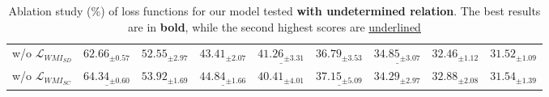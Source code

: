 \begin{table*}[ht]
\begin{adjustbox}{width=\textwidth}
\begin{tabular}{lllllllll}
\quad w/o $\mathcal{L}_{WMI_{SD}}$ & $62.66_{\pm 0.57}$ & $52.55_{\pm 2.97}$ & $43.41_{\pm 2.07}$ & $\underline{41.26_{\pm 3.31}}$ & $36.79_{\pm 3.53}$ & $\underline{34.85_{\pm 3.07}}$ & $32.46_{\pm 1.12}$ & $31.52_{\pm 1.09}$ \\

\quad w/o $\mathcal{L}_{WMI_{SC}}$ &$\underline{64.34_{\pm 0.60}}$ & $\mathbf{53.92_{\pm 1.69}}$ & $\underline{44.84_{\pm 1.66}}$ & $40.41_{\pm 4.01}$ & $\underline{37.15_{\pm 5.09}}$ & $34.29_{\pm 2.97}$ & \underline{$32.88_{\pm 2.08}$} & \underline{$31.54_{\pm 1.39}$} \\


\bottomrule

\end{tabular}%
\end{adjustbox}
\caption{Ablation study (\%) of loss functions for our model tested \textbf{with undetermined relation}. The best results are in \textbf{bold}, while the second highest scores are \underline{underlined}}
\label{table:ablation2}
\end{table*}



